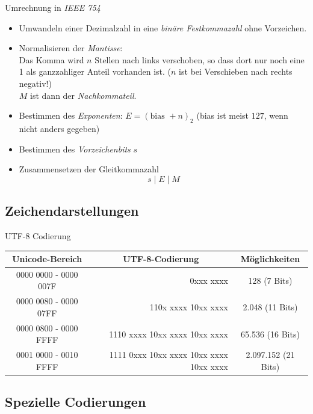 \documentclass[german]{spicker}
\begin{document}
\begin{algo}{Umrechnung in \emph{IEEE 754}}
    \begin{itemize}
        \item Umwandeln einer Dezimalzahl in eine \emph{binäre Festkommazahl} ohne Vorzeichen.
        \item Normalisieren der \emph{Mantisse}:\\
              Das Komma wird $n$ Stellen nach links verschoben, so dass dort nur noch eine 1 als ganzzahliger Anteil vorhanden ist. ($n$ ist bei Verschieben nach rechts negativ!)\\
              $M$ ist dann der \emph{Nachkommateil}.
        \item Bestimmen des \emph{Exponenten}: $E = (\text{bias } + n)_2$ (bias ist meist $127$, wenn nicht anders gegeben)
        \item Bestimmen des \emph{Vorzeichenbits} $s$
        \item Zusammensetzen der Gleitkommazahl
              $$
                  s \mid E \mid M
              $$
    \end{itemize}
\end{algo}

\subsection{Zeichendarstellungen}

\begin{defi}{UTF-8 Codierung}
    \begin{tabular}{| c | r | c |}
        \hline
        Unicode-Bereich       & \multicolumn{1}{|c|}{UTF-8-Codierung}   & Möglichkeiten        \\
        \hline
        0000 0000 - 0000 007F & 0xxx xxxx                               & 128 (7 Bits)         \\
        0000 0080 - 0000 07FF & 110x xxxx 10xx xxxx                     & 2.048 (11 Bits)      \\
        0000 0800 - 0000 FFFF & 1110 xxxx 10xx xxxx 10xx xxxx           & 65.536  (16 Bits)    \\
        0001 0000 - 0010 FFFF & 1111 0xxx 10xx xxxx 10xx xxxx 10xx xxxx & 2.097.152  (21 Bits) \\
        \hline
    \end{tabular}
\end{defi}

\subsection{Spezielle Codierungen}
\end{document}
